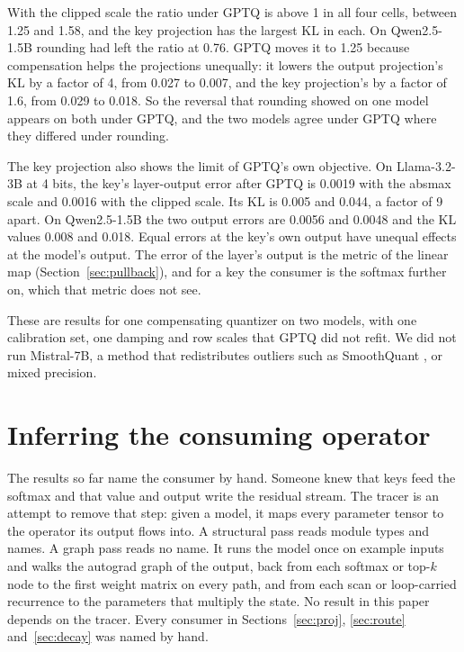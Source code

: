 \documentclass[journal]{IEEEtran}
\newcommand{\KL}{\mathrm{KL}}
\begin{document}
With the clipped scale the ratio under GPTQ is above 1 in all four cells, between 1.25 and 1.58,
and the key projection has the largest $\KL$ in each. On Qwen2.5-1.5B rounding had left the
ratio at 0.76. GPTQ moves it to 1.25 because compensation helps the projections unequally: it
lowers the output projection's $\KL$ by a factor of 4, from 0.027 to 0.007, and the key
projection's by a factor of 1.6, from 0.029 to 0.018. So the reversal that rounding showed on
one model appears on both under GPTQ, and the two models agree under GPTQ where they differed
under rounding.

The key projection also shows the limit of GPTQ's own objective. On Llama-3.2-3B at 4 bits, the
key's layer-output error after GPTQ is 0.0019 with the absmax scale and 0.0016 with the clipped
scale. Its $\KL$ is 0.005 and 0.044, a factor of 9 apart. On Qwen2.5-1.5B the two output errors
are 0.0056 and 0.0048 and the $\KL$ values 0.008 and 0.018. Equal errors at the key's own
output have unequal effects at the model's output. The error of the layer's output is the metric
of the linear map (Section~\ref{sec:pullback}), and for a key the consumer is the softmax
further on, which that metric does not see.

These are results for one compensating quantizer on two models, with one calibration set, one
damping and row scales that GPTQ did not refit. We did not run Mistral-7B, a method that
redistributes outliers such as SmoothQuant \citep{xiao2023smoothquant}, or mixed precision.

\section{Inferring the consuming operator}\label{sec:trace}

The results so far name the consumer by hand. Someone knew that keys feed the softmax and that
value and output write the residual stream. The tracer is an attempt to remove that step: given a
model, it maps every parameter tensor to the operator its output flows into. A structural pass
reads module types and names. A graph pass reads no name. It runs the model once on example
inputs and walks the autograd graph of the output, back from each softmax or top-$k$ node to the
first weight matrix on every path, and from each scan or loop-carried recurrence to the
parameters that multiply the state. No result in this paper depends on the tracer. Every consumer
in Sections~\ref{sec:proj}, \ref{sec:route} and~\ref{sec:decay} was named by hand.
\end{document}
